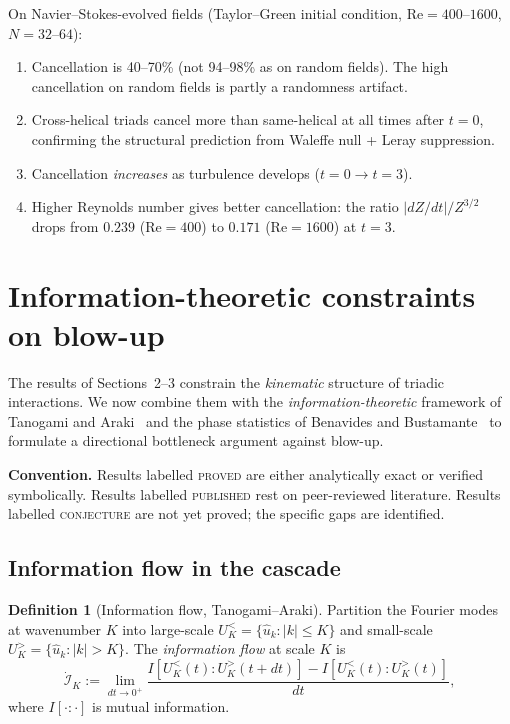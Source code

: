 \documentclass[11pt]{article}
\theoremstyle{definition}
\newtheorem{definition}[theorem]{Definition}
\theoremstyle{remark}
\begin{document}
On Navier--Stokes-evolved fields (Taylor--Green initial condition,
$\mathrm{Re} = 400$--$1600$, $N = 32$--$64$):
\begin{enumerate}
  \item Cancellation is 40--70\% (not 94--98\% as on random fields).
    The high cancellation on random fields is partly a randomness
    artifact.
  \item Cross-helical triads cancel more than same-helical at all
    times after $t = 0$, confirming the structural prediction from
    Waleffe null + Leray suppression.
  \item Cancellation \emph{increases} as turbulence develops
    ($t = 0 \to t = 3$).
  \item Higher Reynolds number gives better cancellation: the ratio
    $|dZ/dt|/Z^{3/2}$ drops from $0.239$ ($\mathrm{Re}=400$) to
    $0.171$ ($\mathrm{Re}=1600$) at $t=3$.
\end{enumerate}

\section{Information-theoretic constraints on blow-up}

The results of Sections~2--3 constrain the \emph{kinematic} structure
of triadic interactions. We now combine them with the
\emph{information-theoretic} framework of Tanogami and
Araki~\cite{TanogamiAraki2025} and the phase statistics of Benavides
and Bustamante~\cite{BenavidesBustamante2026} to formulate a
directional bottleneck argument against blow-up.

\medskip\noindent
\textbf{Convention.} Results labelled \textsc{proved} are either
analytically exact or verified symbolically. Results labelled
\textsc{published} rest on peer-reviewed literature. Results labelled
\textsc{conjecture} are not yet proved; the specific gaps are identified.

\subsection{Information flow in the cascade}

\begin{definition}[Information flow, Tanogami--Araki]
Partition the Fourier modes at wavenumber $K$ into large-scale
$U_K^< = \{\hat{u}_k : |k| \leq K\}$ and small-scale
$U_K^> = \{\hat{u}_k : |k| > K\}$. The \emph{information flow}
at scale $K$ is
\[
  \dot{\mathcal{I}}_K
  := \lim_{dt \to 0^+}
     \frac{I[U_K^<(t) : U_K^>(t+dt)] - I[U_K^<(t) : U_K^>(t)]}{dt},
\]
where $I[\cdot:\cdot]$ is mutual information.
\end{definition}
\end{document}
